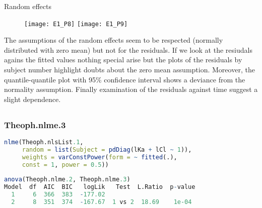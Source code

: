 \documentclass[a4paper,12pt]{article}
\begin{document}
	\newpage
	Random effects
	\begin{figure}[h!]
		\texttt{[image: E1\_P8]}
		\texttt{[image: E1\_P9]}
	\end{figure}
	
	The assumptions of the random effects seem to be respected (normally distributed with zero mean) but not for the residuals. If we look at the resiudals agains the fitted values nothing special arise but the plots of the residuals by subject number highlight doubts about the zero mean assumption. Moreover, the quantile-quantile plot with 95\% confidence interval shows a deviance from the normality assumption. Finally examination of the residuals against time suggest a slight dependence.
	
	\subsection{}
	\subsubsection*{Theoph.nlme.3}
	
	\begin{lstlisting}[language=R]
nlme(Theoph.nlsList.1,
     random = list(Subject = pdDiag(lKa + lCl ~ 1)),
     weights = varConstPower(form = ~ fitted(.),
     const = 1, power = 0.5))
     
anova(Theoph.nlme.2, Theoph.nlme.3)
Model  df  AIC  BIC   logLik   Test  L.Ratio  p-value
  1     6  366  383  -177.02                        
  2     8  351  374  -167.67  1 vs 2  18.69    1e-04
	\end{lstlisting}
	
\end{document}
